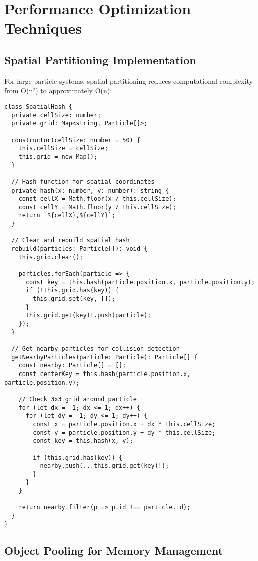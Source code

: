 \documentclass[12pt,journal,onecolumn]{IEEEtran}
\begin{document}
\section{Performance Optimization Techniques}
\label{app:optimization}

\subsection{Spatial Partitioning Implementation}

For large particle systems, spatial partitioning reduces computational complexity from O(n²) to approximately O(n):

\begin{verbatim}
class SpatialHash {
  private cellSize: number;
  private grid: Map<string, Particle[]>;

  constructor(cellSize: number = 50) {
    this.cellSize = cellSize;
    this.grid = new Map();
  }

  // Hash function for spatial coordinates
  private hash(x: number, y: number): string {
    const cellX = Math.floor(x / this.cellSize);
    const cellY = Math.floor(y / this.cellSize);
    return `${cellX},${cellY}`;
  }

  // Clear and rebuild spatial hash
  rebuild(particles: Particle[]): void {
    this.grid.clear();
    
    particles.forEach(particle => {
      const key = this.hash(particle.position.x, particle.position.y);
      if (!this.grid.has(key)) {
        this.grid.set(key, []);
      }
      this.grid.get(key)!.push(particle);
    });
  }

  // Get nearby particles for collision detection
  getNearbyParticles(particle: Particle): Particle[] {
    const nearby: Particle[] = [];
    const centerKey = this.hash(particle.position.x, particle.position.y);
    
    // Check 3x3 grid around particle
    for (let dx = -1; dx <= 1; dx++) {
      for (let dy = -1; dy <= 1; dy++) {
        const x = particle.position.x + dx * this.cellSize;
        const y = particle.position.y + dy * this.cellSize;
        const key = this.hash(x, y);
        
        if (this.grid.has(key)) {
          nearby.push(...this.grid.get(key)!);
        }
      }
    }
    
    return nearby.filter(p => p.id !== particle.id);
  }
}
\end{verbatim}

\subsection{Object Pooling for Memory Management}
\end{document}
